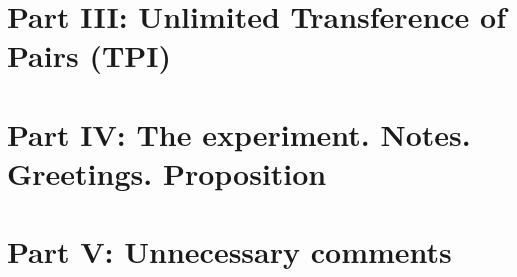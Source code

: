 \documentclass[notitlepage]{report}
\begin{document}
	\part{Part III: Unlimited Transference of Pairs (TPI)}
		
		
		
		
		
		
	\part{Part IV: The experiment. Notes. Greetings. Proposition}
	
		
	
	\part{Part V: Unnecessary comments}
	
		
\end{document}
